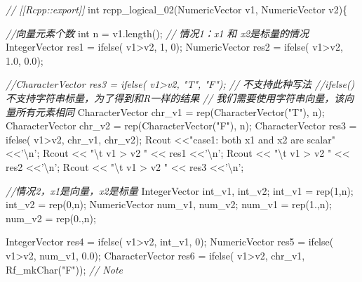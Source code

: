 \documentclass[]{ctexbook}
\newenvironment{Shaded}{\begin{snugshade}}{\end{snugshade}}
\newcommand{\DataTypeTok}[1]{\textcolor[rgb]{0.13,0.29,0.53}{#1}}
\newcommand{\DecValTok}[1]{\textcolor[rgb]{0.00,0.00,0.81}{#1}}
\newcommand{\FloatTok}[1]{\textcolor[rgb]{0.00,0.00,0.81}{#1}}
\newcommand{\SpecialCharTok}[1]{\textcolor[rgb]{0.00,0.00,0.00}{#1}}
\newcommand{\StringTok}[1]{\textcolor[rgb]{0.31,0.60,0.02}{#1}}
\newcommand{\CommentTok}[1]{\textcolor[rgb]{0.56,0.35,0.01}{\textit{#1}}}
\newcommand{\NormalTok}[1]{#1}
\begin{document}
\begin{Shaded}
\begin{Highlighting}[]
\CommentTok{// [[Rcpp::export]]}
\DataTypeTok{int}\NormalTok{ rcpp_logical_02(NumericVector v1, NumericVector v2)\{}
  
  \CommentTok{//向量元素个数}
  \DataTypeTok{int}\NormalTok{ n = v1.length();}
  \CommentTok{// 情况1：x1 和 x2是标量的情况}
\NormalTok{  IntegerVector res1     = ifelse( v1>v2, }\DecValTok{1}\NormalTok{, }\DecValTok{0}\NormalTok{);}
\NormalTok{  NumericVector res2     = ifelse( v1>v2, }\FloatTok{1.0}\NormalTok{, }\FloatTok{0.0}\NormalTok{);}
  
  \CommentTok{//CharacterVector res3 = ifelse( v1>v2, "T", "F"); // 不支持此种写法}
  \CommentTok{//ifelse() 不支持字符串标量，为了得到和R一样的结果}
  \CommentTok{// 我们需要使用字符串向量，该向量所有元素相同 }
\NormalTok{  CharacterVector chr_v1 = rep(CharacterVector(}\StringTok{"T"}\NormalTok{), n);}
\NormalTok{  CharacterVector chr_v2 = rep(CharacterVector(}\StringTok{"F"}\NormalTok{), n);}
\NormalTok{  CharacterVector res3   = ifelse( v1>v2, chr_v1, chr_v2);}
\NormalTok{  Rcout <<}\StringTok{"case1: both x1 and x2 are scalar"}\NormalTok{<<}\StringTok{'}\SpecialCharTok{\textbackslash{}n}\StringTok{'}\NormalTok{;}
\NormalTok{  Rcout << }\StringTok{"}\SpecialCharTok{\textbackslash{}t}\StringTok{ v1 > v2 "}\NormalTok{ << res1 <<}\StringTok{'}\SpecialCharTok{\textbackslash{}n}\StringTok{'}\NormalTok{;}
\NormalTok{  Rcout << }\StringTok{"}\SpecialCharTok{\textbackslash{}t}\StringTok{ v1 > v2 "}\NormalTok{ << res2 <<}\StringTok{'}\SpecialCharTok{\textbackslash{}n}\StringTok{'}\NormalTok{;}
\NormalTok{  Rcout << }\StringTok{"}\SpecialCharTok{\textbackslash{}t}\StringTok{ v1 > v2 "}\NormalTok{ << res3 <<}\StringTok{'}\SpecialCharTok{\textbackslash{}n}\StringTok{'}\NormalTok{;}
  
  \CommentTok{//情况2，x1是向量，x2是标量}
\NormalTok{  IntegerVector int_v1, int_v2;}
\NormalTok{  int_v1 = rep(}\DecValTok{1}\NormalTok{,n);}
\NormalTok{  int_v2 = rep(}\DecValTok{0}\NormalTok{,n);}
\NormalTok{  NumericVector num_v1, num_v2;}
\NormalTok{  num_v1 = rep(}\DecValTok{1}\NormalTok{.,n);}
\NormalTok{  num_v2 = rep(}\DecValTok{0}\NormalTok{.,n);}
  
\NormalTok{  IntegerVector   res4 = ifelse( v1>v2, int_v1, }\DecValTok{0}\NormalTok{);}
\NormalTok{  NumericVector   res5 = ifelse( v1>v2, num_v1, }\FloatTok{0.0}\NormalTok{);}
\NormalTok{  CharacterVector res6 = ifelse( v1>v2, chr_v1, Rf_mkChar(}\StringTok{"F"}\NormalTok{)); }\CommentTok{// Note}
  

\end{Highlighting}
\end{Shaded}
\end{document}
